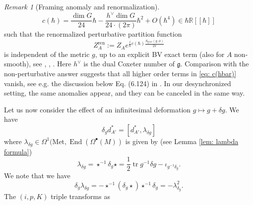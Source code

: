 \documentclass[11pt,a4paper]{amsart}
\theoremstyle{plain} %
\theoremstyle{definition}
\theoremstyle{remark}
\newtheorem{rem}[thm]{Remark}
\newcommand{\g}{\mathfrak{g}}
\newcommand{\tr}{\operatorname{tr}}
\newcommand{\mr}{\mathrm}
\begin{document}
{\begin{rem}[Framing anomaly and renormalization]
\begin{equation}
c(\hbar)  =  %
\frac{\dim G}{24}\hbar  - \frac{h^\vee\dim G}{24\cdot (2\pi)}\hbar^2  + O(\hbar^4)
\in  \hbar\mathbb{R}[[\hbar]]\label{eq: c(hbar)}
\end{equation}
such that the renormalized perturbative partition function 
\begin{equation}\label{eq: ren Z}
    Z^\mr{ren}_{A}:=Z_A e^{\frac{i}{\hbar}c(\hbar)\frac{S_\mr{grav}(g,\phi)}{2\pi}}
\end{equation}
is independent of the metric $g$, up to an explicit BV exact term (also for $A$ non-smooth), see \cite{Cattaneo2008}, \cite{mnev2019quantum}, \cite{Wernli2019}.  Here $h^\vee$ is the dual Coxeter number of $\g$.  Comparison with the non-perturbative answer suggests that all higher order terms in \eqref{eq: c(hbar)} vanish, see e.g. the discussion below Eq. (6.124) in \cite{Axelrod1991}.
In our desynchronized setting, the same anomalies appear, and they can be canceled in the same way. 
\end{rem}
Let us now consider the effect of an infinitesimal deformation $g \mapsto g + \delta g$. We have 
\begin{equation}
    \delta_g d_{A'}^* = [d_{A'}^*,\lambda_{\delta g}] 
\end{equation}
where $\lambda_{\delta g} \in \Omega^1(\mr{Met}, \operatorname{End}(\Omega^\bullet(M))$ is given by (see Lemma \ref{lem: lambda formula}) 
\begin{equation}
    \lambda_{\delta g} = \star^{-1} \delta_g\star = \frac12 \tr g^{-1}\delta g - \iota_{g^{-1}\delta_g}. 
\end{equation}
We note that we have 
\begin{equation}
    \delta_g\lambda_{\delta g} = - \star^{-1}(\delta_g\star)\star^{-1}\delta_g = -\lambda_{\delta_g}^2. 
\end{equation}
The $(i,p,K)$ triple transforms as 
\begin{align}

\end{align}}
\end{document}
